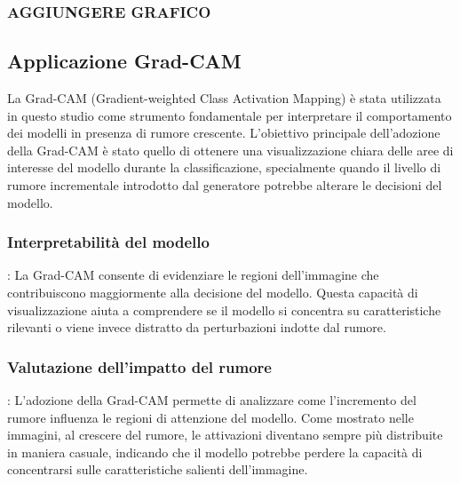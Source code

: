 \subsubsection{AGGIUNGERE GRAFICO}

\subsection{Applicazione Grad-CAM}
La Grad-CAM (Gradient-weighted Class Activation Mapping) è stata utilizzata in questo studio come strumento fondamentale per interpretare il comportamento dei modelli in presenza di rumore crescente. L'obiettivo principale dell'adozione della Grad-CAM è stato quello di ottenere una visualizzazione chiara delle aree di interesse del modello durante la classificazione, specialmente quando il livello di rumore incrementale introdotto dal generatore potrebbe alterare le decisioni del modello.
\subsubsection{Interpretabilità del modello}:
La Grad-CAM consente di evidenziare le regioni dell'immagine che contribuiscono maggiormente alla decisione del modello. Questa capacità di visualizzazione aiuta a comprendere se il modello si concentra su caratteristiche rilevanti o viene invece distratto da perturbazioni indotte dal rumore.
\subsubsection{Valutazione dell'impatto del rumore}:
L'adozione della Grad-CAM permette di analizzare come l'incremento del rumore influenza le regioni di attenzione del modello. Come mostrato nelle immagini, al crescere del rumore, le attivazioni diventano sempre più distribuite in maniera casuale, indicando che il modello potrebbe perdere la capacità di concentrarsi sulle caratteristiche salienti dell'immagine.


